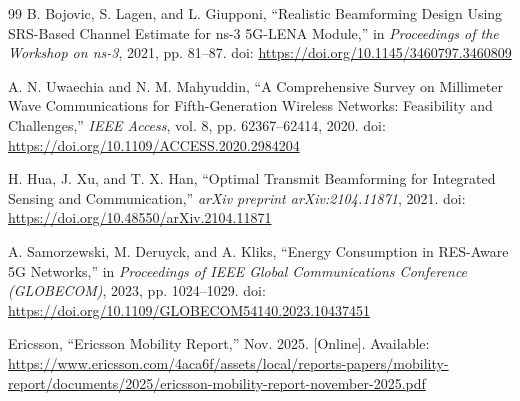 \begin{thebibliography}{99}
    B. Bojovic, S. Lagen, and L. Giupponi,
    ``Realistic Beamforming Design Using SRS-Based Channel Estimate for ns-3 5G-LENA Module,''
    in \emph{Proceedings of the Workshop on ns-3}, 2021, pp. 81--87.
    doi: \url{https://doi.org/10.1145/3460797.3460809}

    A. N. Uwaechia and N. M. Mahyuddin,
    ``A Comprehensive Survey on Millimeter Wave Communications for Fifth-Generation Wireless Networks: Feasibility and Challenges,''
    \emph{IEEE Access}, vol. 8, pp. 62367--62414, 2020.
    doi: \url{https://doi.org/10.1109/ACCESS.2020.2984204}

    H. Hua, J. Xu, and T. X. Han,
    ``Optimal Transmit Beamforming for Integrated Sensing and Communication,''
    \emph{arXiv preprint arXiv:2104.11871}, 2021.
    doi: \url{https://doi.org/10.48550/arXiv.2104.11871}

    A. Samorzewski, M. Deruyck, and A. Kliks,
    ``Energy Consumption in RES-Aware 5G Networks,''
    in \emph{Proceedings of IEEE Global Communications Conference (GLOBECOM)}, 2023, pp. 1024--1029.
    doi: \url{https://doi.org/10.1109/GLOBECOM54140.2023.10437451}

    Ericsson, ``Ericsson Mobility Report,'' Nov. 2025. [Online]. Available:
    \url{https://www.ericsson.com/4aca6f/assets/local/reports-papers/mobility-report/documents/2025/ericsson-mobility-report-november-2025.pdf}

\end{thebibliography}
